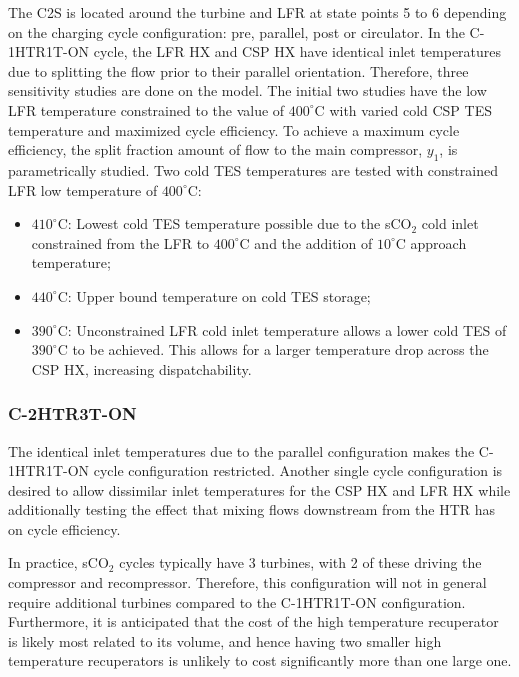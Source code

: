 \begin{paracol}{2}
\linenumbers
\switchcolumn

The C2S is located around the turbine and LFR at state points 5 to 6 depending on the charging cycle configuration: pre, parallel, post or circulator. In the C-1HTR1T-ON cycle, the LFR HX and CSP HX have identical inlet temperatures due to splitting the flow prior to their parallel orientation. Therefore, three sensitivity studies are done on the model. The initial two studies have the low LFR temperature constrained to the value of $400^{\circ}$C with varied cold CSP TES temperature and maximized cycle efficiency. To achieve a maximum cycle efficiency, the split fraction amount of flow to the main compressor, $y_{1}$, is parametrically studied.
Two cold TES temperatures are tested with constrained LFR low temperature of $400^{\circ}$C: 
\begin{itemize}
    \item	$410^{\circ}$C: Lowest cold TES temperature possible due to the sCO$_2$ cold inlet constrained from the LFR to $400^{\circ}$C and the addition of $10^{\circ}$C approach temperature;
    \item	$440^{\circ}$C: Upper bound temperature on cold TES storage;
    \item	$390^{\circ}$C: Unconstrained LFR cold inlet temperature allows a lower cold TES of $390^{\circ}$C to be achieved. This allows for a larger temperature drop across the CSP HX, increasing dispatchability.
\end{itemize}


\subsubsection{C-2HTR3T-ON} 

The identical inlet temperatures due to the parallel configuration makes the C-1HTR1T-ON cycle configuration restricted. Another single cycle configuration is desired to allow dissimilar inlet temperatures for the CSP HX and LFR HX while additionally testing the effect that mixing flows downstream from the HTR has on cycle efficiency. 

In practice, sCO$_2$ cycles typically have 3 turbines, with 2 of these driving the compressor and recompressor. Therefore, this configuration will not in general require additional turbines compared to the C-1HTR1T-ON configuration. Furthermore, it is anticipated that the cost of the high temperature recuperator is likely most related to its volume, and hence having two smaller high temperature recuperators is unlikely to cost significantly more than one large one. 


\end{paracol}
